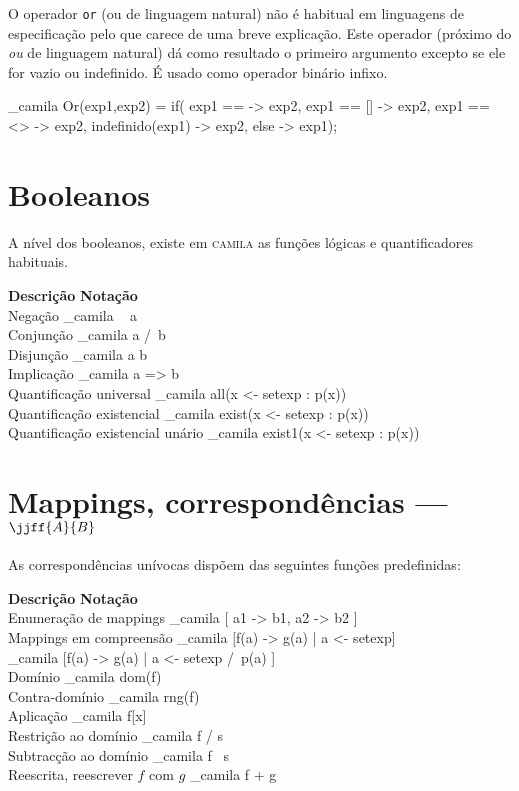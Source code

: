 \documentclass[portuges,a4paper]{article}
\def\camila{\textsc{camila}}
\begin{document}
O operador \texttt{or}  (ou de linguagem natural) não é habitual em linguagens
de especificação pelo que carece de uma breve explicação.
Este operador (próximo do \emph{ou} de linguagem natural) dá como resultado 
o primeiro argumento excepto se ele for vazio ou indefinido. É usado como
operador binário infixo.

\_camila{
  Or(exp1,exp2)  = if(
         exp1 == {}  -> exp2,
         exp1 == []  -> exp2,
         exp1 == <>  -> exp2,
         indefinido(exp1) -> exp2,
         else        -> exp1);
}


\section{Booleanos}

A nível dos booleanos, existe em \camila{} as funções lógicas e quantificadores
habituais.

\begin{framed}
\noindent \textbf{Descrição}  \hfill  \textbf{Notação} \ \  \\
 Negação   \dotfill \_camila{ ~ a } \\
 Conjunção \dotfill \_camila{ a /\ b } \\
 Disjunção \dotfill \_camila{ a \/ b } \\
 Implicação \dotfill \_camila{ a => b } \\
 Quantificação universal \dotfill \_camila{ all(x <- setexp : p(x))  } \\
 Quantificação existencial \dotfill \_camila{ exist(x <- setexp : p(x))  } \\
 Quantificação existencial unário \dotfill \_camila{ exist1(x <- setexp : p(x))  } 
\end{framed}

\section{Mappings, correspondências --- $\jjff{A}{B}$ }

As correspondências unívocas dispõem das seguintes funções predefinidas:
\begin{framed}
\noindent \textbf{Descrição}  \hfill  \textbf{Notação} \ \  \\
 Enumeração de mappings \dotfill  \_camila{ [ a1 -> b1, a2 -> b2 ] } \\
 Mappings em compreensão  \dotfill \_camila{ [f(a) -> g(a) | a <- setexp]} \\
 \mbox{} \hfill \_camila{ [f(a) -> g(a) | a <- setexp /\ p(a) ]} \\
  Domínio  \dotfill  \_camila{ dom(f)} \\
  Contra-domínio  \dotfill  \_camila{ rng(f) } \\
  Aplicação  \dotfill  \_camila{ f[x] } \\
  Restrição ao domínio \dotfill  \_camila{ f / s} \\
  Subtracção ao domínio \dotfill  \_camila{ f \ s} \\
  Reescrita, reescrever $f$ com  $g$ \dotfill   \_camila{ f + g}
\end{framed}
\end{document}
